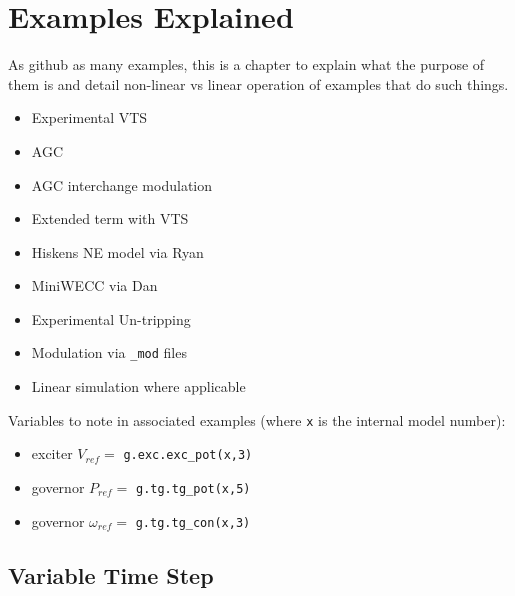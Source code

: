 \chapter{Examples Explained}
As github as many examples, this is a chapter to explain what the purpose of them is and detail non-linear vs linear operation of examples that do such things.

\begin{itemize}
\item Experimental VTS
\item AGC
\item AGC interchange modulation
\item Extended term with VTS
\item Hiskens NE model via Ryan
\item MiniWECC via Dan
\item Experimental Un-tripping
\item Modulation via \verb|_mod| files
\item Linear simulation where applicable
\end{itemize}

Variables to note in associated examples (where \verb|x| is the internal model number):
\begin{itemize}
\item exciter $V_{ref} = $ \verb|g.exc.exc_pot(x,3)|
\item governor $P_{ref} = $ \verb|g.tg.tg_pot(x,5)|
\item governor $\omega_{ref} = $ \verb|g.tg.tg_con(x,3)|
\end{itemize}


\section{Variable Time Step}